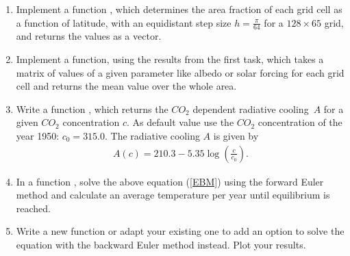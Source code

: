 \documentclass[10pt]{scrartcl}
\begin{document}
\begin{enumerate}
\item Implement a function \small\texttt{}\normalsize, which determines the area fraction of each grid cell as a function of latitude, with an equidistant step size $h=\frac{\pi}{64}$ for a $128 \times 65$ grid, and returns the values as a vector.
\item Implement a \small\texttt{} \normalsize function, using the results from the first task, which takes a matrix of values of a given parameter like albedo or solar forcing for each grid cell and returns the mean value over the whole area.
\item Write a function \small\texttt{}\normalsize, which returns the $CO_2$ dependent radiative cooling~$A$ for a given $CO_2$ concentration $c$. As default value use the $CO_2$ concentration of the year 1950: $c_0 = 315.0$. The radiative cooling $A$ is given by
\begin{align}
A (c) = 210.3-5.35 \log\left(\frac{c}{c_0}\right).
\label{A}
\end{align}
\item In a function \small\texttt{}\normalsize, solve the above equation (\ref{EBM}) using the forward Euler method and calculate an average temperature per year until equilibrium is reached.
\item Write a new function or adapt your existing one to add an option to solve the equation with the backward Euler method instead. Plot your results.

\end{enumerate}




\end{document}
